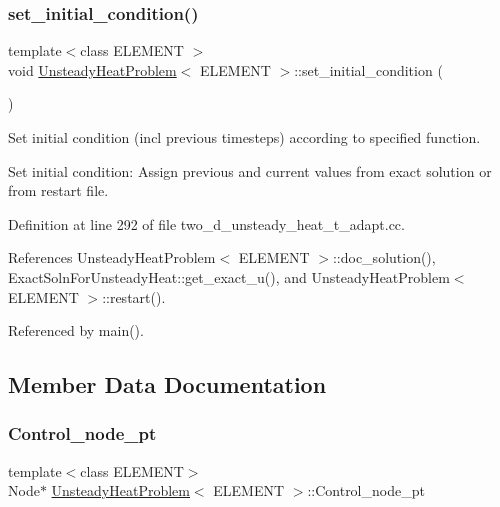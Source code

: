 \mbox{\label{classUnsteadyHeatProblem_a98de3ed2d9cf5409323121bbb482bc1b}} 
\subsubsection{\texorpdfstring{set\+\_\+initial\+\_\+condition()}{set\_initial\_condition()}}
{\footnotesize\ttfamily template$<$class E\+L\+E\+M\+E\+NT $>$ \\
void \hyperlink{classUnsteadyHeatProblem}{Unsteady\+Heat\+Problem}$<$ E\+L\+E\+M\+E\+NT $>$\+::set\+\_\+initial\+\_\+condition (\begin{DoxyParamCaption}{ }\end{DoxyParamCaption})}



Set initial condition (incl previous timesteps) according to specified function. 

Set initial condition\+: Assign previous and current values from exact solution or from restart file. 

Definition at line 292 of file two\+\_\+d\+\_\+unsteady\+\_\+heat\+\_\+t\+\_\+adapt.\+cc.



References Unsteady\+Heat\+Problem$<$ E\+L\+E\+M\+E\+N\+T $>$\+::doc\+\_\+solution(), Exact\+Soln\+For\+Unsteady\+Heat\+::get\+\_\+exact\+\_\+u(), and Unsteady\+Heat\+Problem$<$ E\+L\+E\+M\+E\+N\+T $>$\+::restart().



Referenced by main().



\subsection{Member Data Documentation}
\mbox{\label{classUnsteadyHeatProblem_a33f2d1de7d1fa651df34bc0e4e747c67}} 
\subsubsection{\texorpdfstring{Control\+\_\+node\+\_\+pt}{Control\_node\_pt}}
{\footnotesize\ttfamily template$<$class E\+L\+E\+M\+E\+NT$>$ \\
Node$\ast$ \hyperlink{classUnsteadyHeatProblem}{Unsteady\+Heat\+Problem}$<$ E\+L\+E\+M\+E\+NT $>$\+::Control\+\_\+node\+\_\+pt\hspace{0.3cm}{\ttfamily [private]}}



